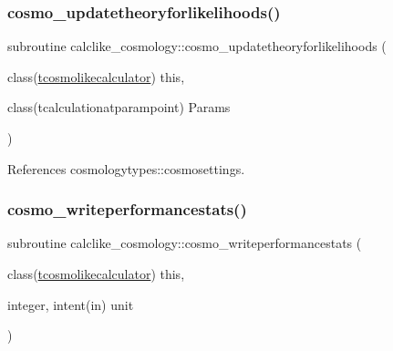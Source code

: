 \subsubsection{\texorpdfstring{cosmo\+\_\+updatetheoryforlikelihoods()}{cosmo\_updatetheoryforlikelihoods()}}
{\footnotesize\ttfamily subroutine calclike\+\_\+cosmology\+::cosmo\+\_\+updatetheoryforlikelihoods (\begin{DoxyParamCaption}\item[{class(\mbox{\hyperlink{structcalclike__cosmology_1_1tcosmolikecalculator}{tcosmolikecalculator}})}]{this,  }\item[{class(tcalculationatparampoint)}]{Params }\end{DoxyParamCaption})\hspace{0.3cm}{\ttfamily [private]}}



References cosmologytypes\+::cosmosettings.

\mbox{\label{namespacecalclike__cosmology_a98c01c544a399527119cde828e456b4b}} 
\subsubsection{\texorpdfstring{cosmo\+\_\+writeperformancestats()}{cosmo\_writeperformancestats()}}
{\footnotesize\ttfamily subroutine calclike\+\_\+cosmology\+::cosmo\+\_\+writeperformancestats (\begin{DoxyParamCaption}\item[{class(\mbox{\hyperlink{structcalclike__cosmology_1_1tcosmolikecalculator}{tcosmolikecalculator}})}]{this,  }\item[{integer, intent(in)}]{unit }\end{DoxyParamCaption})\hspace{0.3cm}{\ttfamily [private]}}

\mbox{\label{namespacecalclike__cosmology_a86c0c49dcb09440792bc5a002f456f57}} 
